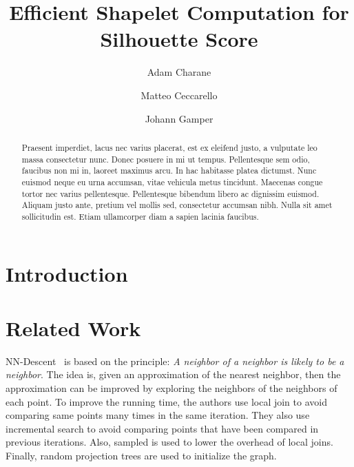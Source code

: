 \documentclass[sigconf, nonacm]{acmart}
\begin{document}
\title{Efficient Shapelet Computation for Silhouette Score}

\author{Adam Charane}

\author{Matteo Ceccarello}

\author{Johann Gamper}

\begin{abstract}
	Praesent imperdiet, lacus nec varius placerat, est ex eleifend justo, a vulputate leo massa consectetur nunc. Donec posuere in mi ut tempus. Pellentesque sem odio, faucibus non mi in, laoreet maximus arcu. In hac habitasse platea dictumst. Nunc euismod neque eu urna accumsan, vitae vehicula metus tincidunt. Maecenas congue tortor nec varius pellentesque. Pellentesque bibendum libero ac dignissim euismod. Aliquam justo ante, pretium vel mollis sed, consectetur accumsan nibh. Nulla sit amet sollicitudin est. Etiam ullamcorper diam a sapien lacinia faucibus.
\end{abstract}

\maketitle

\section{Introduction}

\section{Related Work}
NN-Descent~\cite{NN-Descent} is based on the principle: \textit{A neighbor of
a neighbor is likely to be a neighbor}. The idea is, given an approximation of 
the nearest neighbor, then the approximation can be improved by exploring the 
neighbors of the neighbors of each point. To improve the running time, the 
authors use local join to avoid comparing same points many times in the same 
iteration. They also use incremental search to avoid comparing points that have
been compared in previous iterations. Also, sampled is used to lower the 
overhead of local joins. Finally, random projection trees are used to 
initialize the graph.



\end{document}
